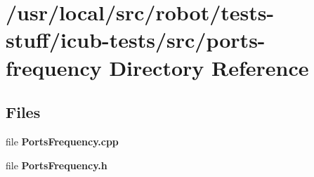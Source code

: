 \section{/usr/local/src/robot/tests-\/stuff/icub-\/tests/src/ports-\/frequency Directory Reference}
\label{dir_f2915d824dbcc9cd56b46b61c487d65c}
\subsection*{Files}
\begin{DoxyCompactItemize}
\item 
file {\bfseries Ports\-Frequency.\-cpp}
\item 
file {\bfseries Ports\-Frequency.\-h}
\end{DoxyCompactItemize}
